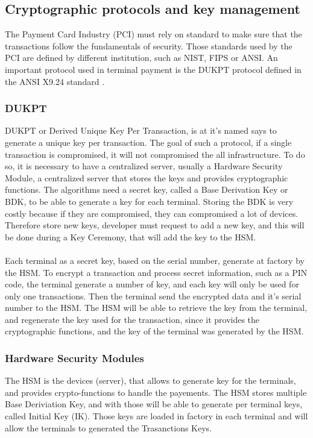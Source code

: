 \documentclass[11pt,a4paper]{article}
\begin{document}
\subsection{Cryptographic protocols and key management}

The Payment Card Industry (PCI) must rely on standard to make
sure that the transactions follow the fundamentals of security.
Those standards used by the PCI are defined by different institution, such
as NIST, FIPS or ANSI. An important protocol used in terminal payment
is the DUKPT protocol defined in
the ANSI X9.24 standard \cite{ansi_x924}.

\subsubsection{DUKPT}

DUKPT or Derived Unique Key Per Transaction, is at it's named
says to generate a unique key per transaction.
The goal of such a protocol, if a single transaction is compromised,
it will not compromised the all infrastructure.
To do so, it is necessary to have a centralized server, usually
a Hardware Security Module, a centralized server that stores
the keys and provides cryptographic functions.
The algorithms need a secret key,
called a Base Derivation Key or BDK, to be able to generate
a key for each terminal. Storing the BDK is very costly because
if they are compromised, they can compromised a lot of devices.
Therefore store new keys, developer must request to add a new
key, and this will be done during a Key Ceremony, that will
add the key to the HSM.

\paragraph{}

Each terminal as a secret key, based on the serial number,
generate at factory by the HSM. To encrypt a transaction and process
secret information, such as a PIN code, the terminal generate a number
of key, and each key will only be used for only one transactions.
Then the terminal send the encrypted data and it's serial number to the HSM.
The HSM will be able to retrieve the key from the terminal, and
regenerate the key used for the transaction, since it provides
the cryptographic functions, and the
key of the terminal was generated by the HSM.


\subsubsection{Hardware Security Modules}


\label{sec:hsm}

The HSM is the devices (server), that allows to generate
key for the terminals, and provides crypto-functions to handle
the payements. The HSM stores multiple Base Deriviation Key, and
with those will be able to generate per terminal keys,
called Initial Key (IK). Those keys are loaded in factory
in each terminal and will allow the terminals to generated
the Trasanctions Keys.




\end{document}
